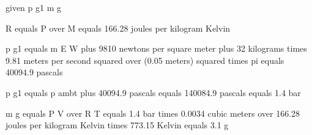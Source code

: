given p g1 m g

R equals P over M equals 166.28 joules per kilogram Kelvin

p g1 equals m E W plus 9810 newtons per square meter plus 32 kilograms times 9.81 meters per second squared over (0.05 meters) squared times pi equals 40094.9 pascals

p g1 equals p ambt plus 40094.9 pascals equals 140084.9 pascals equals 1.4 bar

m g equals P V over R T equals 1.4 bar times 0.0034 cubic meters over 166.28 joules per kilogram Kelvin times 773.15 Kelvin equals 3.1 g